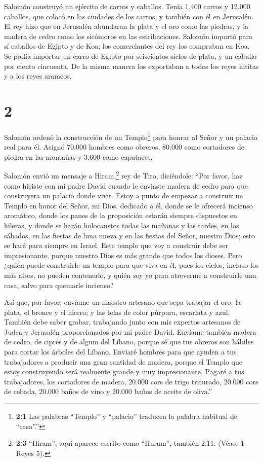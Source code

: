  Salomón construyó un ejército de carros y caballos. Tenía
1.400 carros y 12.000 caballos, que colocó en las ciudades de los
carros, y también con él en Jerusalén.  El rey hizo que en
Jerusalén abundaran la plata y el oro como las piedras, y la madera de
cedro como los sicómoros en las estribaciones.  Salomón
importó para sí caballos de Egipto y de Koa; los comerciantes del rey
los compraban en Koa.  Se podía importar un carro de Egipto
por seiscientos siclos de plata, y un caballo por ciento cincuenta. De
la misma manera los exportaban a todos los reyes hititas y a los reyes
arameos.

\hypertarget{section-1}{%
\section{2}\label{section-1}}

 Salomón ordenó la construcción de un Templo\footnote{\textbf{2:1}
  Las palabras ``Templo'' y ``palacio'' traducen la palabra habitual de
  ``casa''.''} para honrar al Señor y un palacio real para él.
 Asignó 70.000 hombres como obreros, 80.000 como cortadores
de piedra en las montañas y 3.600 como capataces.

 Salomón envió un mensaje a Hiram,\footnote{\textbf{2:3}
  ``Hiram'', aquí aparece escrito como ``Huram'', también 2:11. (Véase 1
  Reyes 5).} rey de Tiro, diciéndole:  ``Por favor, haz como
hiciste con mi padre David cuando le enviaste madera de cedro para que
construyera un palacio donde vivir. Estoy a punto de empezar a construir
un Templo en honor del Señor, mi Dios, dedicado a él, donde se le
ofrecerá incienso aromático, donde los panes de la proposición estarán
siempre dispuestos en hileras, y donde se harán holocaustos todas las
mañanas y las tardes, en los sábados, en las fiestas de luna nueva y en
las fiestas del Señor, nuestro Dios; esto se hará para siempre en
Israel.  Este templo que voy a construir debe ser
impresionante, porque nuestro Dios es más grande que todos los dioses.
 Pero ¿quién puede construirle un templo para que viva en
él, pues los cielos, incluso los más altos, no pueden contenerlo, y
quién soy yo para atreverme a construirle una casa, salvo para quemarle
incienso?

 Así que, por favor, envíame un maestro artesano que sepa
trabajar el oro, la plata, el bronce y el hierro; y las telas de color
púrpura, escarlata y azul. También debe saber grabar, trabajando junto
con mis expertos artesanos de Judea y Jerusalén proporcionados por mi
padre David.  Envíame también madera de cedro, de ciprés y
de algum del Líbano, porque sé que tus obreros son hábiles para cortar
los árboles del Líbano. Enviaré hombres para que ayuden a tus
trabajadores  a producir una gran cantidad de madera, porque
el Templo que estoy construyendo será realmente grande y muy
impresionante.  Pagaré a tus trabajadores, los cortadores
de madera, 20.000 cors de trigo triturado, 20.000 cors de cebada, 20.000
baños de vino y 20.000 baños de aceite de oliva.''

